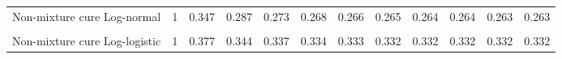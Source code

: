 \documentclass[
]{article}
\begin{document}
\begin{table}[H]
{\begin{tabular}[t]{lrrrrrrrrrrr}
Non-mixture cure Log-normal & 1 & 0.347 & 0.287 & 0.273 & 0.268 & 0.266 & 0.265 & 0.264 & 0.264 & 0.263 & 0.263\\
\cellcolor{gray!10}{Mixture cure Log-logistic} & \cellcolor{gray!10}{1} & \cellcolor{gray!10}{0.372} & \cellcolor{gray!10}{0.337} & \cellcolor{gray!10}{0.330} & \cellcolor{gray!10}{0.327} & \cellcolor{gray!10}{0.326} & \cellcolor{gray!10}{0.325} & \cellcolor{gray!10}{0.325} & \cellcolor{gray!10}{0.325} & \cellcolor{gray!10}{0.324} & \cellcolor{gray!10}{0.324}\\
Non-mixture cure Log-logistic & 1 & 0.377 & 0.344 & 0.337 & 0.334 & 0.333 & 0.332 & 0.332 & 0.332 & 0.332 & 0.332\\
\bottomrule
\end{tabular}}
\end{table}
\end{document}
